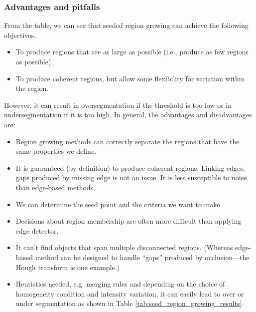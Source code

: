 \documentclass[a4paper]{article}
\begin{document}
\subsubsection{Advantages and pitfalls}
From the table, we can see that seeded region growing can achieve the following objectives.
\begin{itemize}
    \item To produce regions that are as large as possible (i.e., produce as few regions as possible)
    \item To produce coherent regions, but allow some flexibility for variation within the region.
\end{itemize}
However, it can result in oversegmentation if the threshold is too low or in undersegmentation if it is too high. In general, the advantages and disadvantages are:
\begin{multicols}{2}
\begin{itemize}
    \item[\textcolor{DarkPink}{\ding{51}}] Region growing methods can correctly separate the regions that have the same properties we define.
    \item[\textcolor{DarkPink}{\ding{51}}] It is guaranteed (by definition) to produce coherent regions. Linking edges, gaps produced by missing edge is not an issue. It is less susceptible to noise than edge-based methods.
    \item[\textcolor{DarkPink}{\ding{51}}] We can determine the seed point and the criteria we want to make.
\end{itemize}
\columnbreak
\begin{itemize}
    \item[\textcolor{DarkPink}{\ding{55}}] Decisions about region membership are often more difficult than applying edge detector.
    \item[\textcolor{DarkPink}{\ding{55}}] It can't find objects that span multiple disconnected regions. (Whereas edge-based method can be designed to handle “gaps” produced by occlusion—the Hough transform is one example.)
    \item[\textcolor{DarkPink}{\ding{55}}] Heuristics needed, e.g. merging rules and depending on the choice of homogeneity condition and intensity variation, it can easily lead to over or under segmentation as shown in Table \ref{tab:seed_region_growing_results}.
\end{itemize}
\end{multicols}
\end{document}
